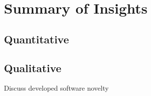 \documentclass[main]{subfiles}
\begin{document}




\section{Summary of Insights}
\subsection{Quantitative}

\subsection{Qualitative}







Discuss developed software novelty
\end{document}
